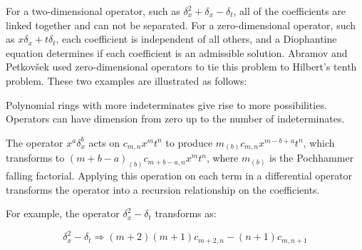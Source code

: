 \documentclass{article}
\begin{document}
\begin{center}
\end{center}


For a two-dimensional operator, such as $\delta_x^2+\delta_x-\delta_t$,
all of the coefficients are linked together and can not be separated.
For a zero-dimensional operator, such as $x\delta_x + t\delta_t$,
each coefficient is independent of all others, and a Diophantine
equation determines if each coefficient is an admissible solution.
Abramov and Petkov\v sek used zero-dimensional operators to tie
this problem to Hilbert's tenth problem.
These two examples are illustrated as follows:

\begin{center}
\end{center}

Polynomial rings with more indeterminates give rise to more possibilities.
Operators can have dimension from zero up to the number of indeterminates.

The operator $x^a \delta_x^b$ acts on $c_{m,n} x^m t^n$ to produce
$m_{(b)} c_{m,n} x^{m-b+a} t^n$, which transforms to $(m+b-a)_{(b)}
c_{m+b-a,n} x^m t^n$, where $m_{(b)}$ is the Pochhammer falling
factorial.  Applying this operation on each term in a differential
operator transforms the operator into a recursion relationship on the
coefficients.

For example, the operator $\delta_x^2 - \delta_t$ transforms as:

$$\delta_x^2 - \delta_t \Longrightarrow (m+2)(m+1)c_{m+2,n} - (n+1)c_{m,n+1}$$
\end{document}
